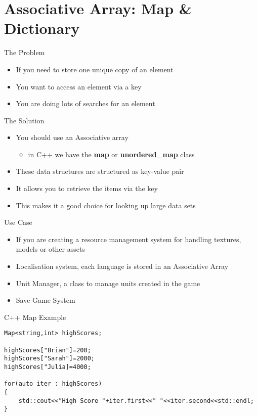 \part{Associative Array: Map \& Dictionary}
\frame{\partpage}

\begin{frame}{The Problem}
	\begin{itemize}
		\pause \item If you need to store one unique copy of an element
		\pause \item You want to access an element via a key
		\pause \item You are doing lots of searches for an element
	\end{itemize}
\end{frame}

\begin{frame}{The Solution}
	\begin{itemize}
		\pause \item You should use an Associative array
		\begin{itemize}
			\pause \item in C++ we have the \textbf{map} or \textbf{unordered\_map}  class
		\end{itemize} 
		\pause \item These data structures are structured as key-value pair
		\pause \item It allows you to retrieve the items via the key
		\pause \item This makes it a good choice for looking up large data sets
	\end{itemize}
\end{frame}

\begin{frame}{Use Case}
	\begin{itemize}
		\pause \item If you are creating a resource management system for handling textures, models or other assets
		\pause \item Localisation system, each language is stored in an Associative Array
		\pause \item Unit Manager, a class to manage units created in the game
		\pause \item Save Game System
	\end{itemize}
\end{frame}


\begin{frame}[fragile]{C++ Map
Example}
\begin{lstlisting}
Map<string,int> highScores;

highScores["Brian"]=200;
highScores["Sarah"]=2000;
highScores["Julia]=4000;

for(auto iter : highScores)
{
	std::cout<<"High Score "+iter.first<<" "<<iter.second<<std::endl;
}
\end{lstlisting}
\end{frame}


